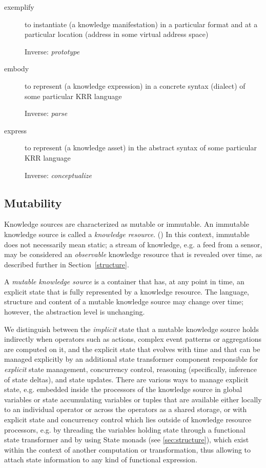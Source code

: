 \documentclass[runningheads]{llncs}
\begin{document}
\begin{description}
\item[exemplify] to instantiate (a knowledge manifestation) in a particular format and at a particular location (address in some virtual address space)

Inverse: \emph{prototype}
\item[embody] to represent (a knowledge expression) in a concrete syntax (dialect) of some particular KRR language

Inverse: \emph{parse}
\item[express] to represent (a knowledge asset) in the abstract syntax of some particular KRR language

Inverse: \emph{conceptualize}
\end{description}

\subsection{Mutability}
Knowledge sources are characterized as mutable or immutable. An immutable knowledge source is called a \emph{knowledge resource}. () In this context, immutable does not necessarily mean static;  a stream of knowledge, e.g. a feed from a sensor, may be considered an \emph{observable} knowledge resource that is revealed over time, as described further in Section~\ref{structure}.

A \emph{mutable knowledge source} is a container that has, at any point in time, an explicit state that is fully represented by a knowledge resource. The language, structure and content of a mutable knowledge source may change over time; however, the abstraction level is unchanging.

We distinguish between the \textit{implicit} state that a mutable knowledge source holds indirectly when operators such as actions, complex  event patterns or aggregations are computed on it, and the explicit state that evolves with time and that can be managed explicitly by an additional state transformer component responsible for \textit{explicit} state management, concurrency control, reasoning (specifically, inference of state deltas), and state updates. 
There are various ways to manage explicit state, e.g. embedded inside the processors of the knowledge source in global variables or state accumulating variables or tuples that are available either locally to an individual operator or across the operators as a shared storage, or with explicit state and concurrency control which lies outside of knowledge resource processors, e.g. by threading the variables holding state through a functional state transformer and by using State monads (see \ref{sec:structure}), which exist within the context of another computation or transformation, thus allowing to attach state information to any kind of functional expression.
\end{document}
